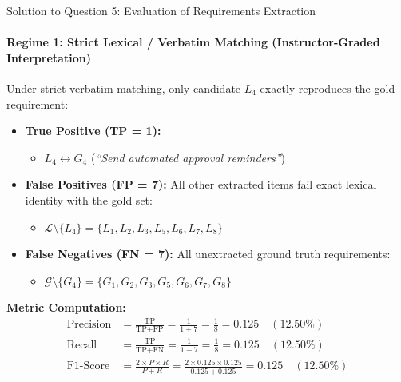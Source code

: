 \documentclass[11pt,a4paper]{article}
\begin{document}
\begin{solutionbox}{Solution to Question 5: Evaluation of Requirements Extraction}
\paragraph{Regime 1: Strict Lexical / Verbatim Matching (Instructor-Graded Interpretation)}
Under strict verbatim matching, only candidate $L_4$ exactly reproduces the gold requirement:
\begin{itemize}[leftmargin=1.5em]
    \item \textbf{True Positive (TP = 1):}
    \begin{itemize}
        \item $L_4 \longleftrightarrow G_4$ (\textit{“Send automated approval reminders”})
    \end{itemize}
    \item \textbf{False Positives (FP = 7):} All other extracted items fail exact lexical identity with the gold set:
    \begin{itemize}
        \item $\mathcal{L} \setminus \{L_4\} = \{L_1, L_2, L_3, L_5, L_6, L_7, L_8\}$
    \end{itemize}
    \item \textbf{False Negatives (FN = 7):} All unextracted ground truth requirements:
    \begin{itemize}
        \item $\mathcal{G} \setminus \{G_4\} = \{G_1, G_2, G_3, G_5, G_6, G_7, G_8\}$
    \end{itemize}
\end{itemize}
\textbf{Metric Computation:}
\begin{align}
    \text{Precision} &= \frac{\text{TP}}{\text{TP} + \text{FP}} = \frac{1}{1 + 7} = \frac{1}{8} = \mathbf{0.125} \quad (\mathbf{12.50\%}) \\
    \text{Recall} &= \frac{\text{TP}}{\text{TP} + \text{FN}} = \frac{1}{1 + 7} = \frac{1}{8} = \mathbf{0.125} \quad (\mathbf{12.50\%}) \\
    \text{F1-Score} &= \frac{2 \times P \times R}{P + R} = \frac{2 \times 0.125 \times 0.125}{0.125 + 0.125} = \mathbf{0.125} \quad (\mathbf{12.50\%})
\end{align}


\end{solutionbox}
\end{document}
